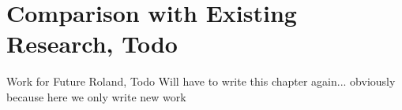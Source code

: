 \section{Comparison with Existing Research, Todo}
Work for Future Roland, Todo
Will have to write this chapter again... obviously because here we only write new work
